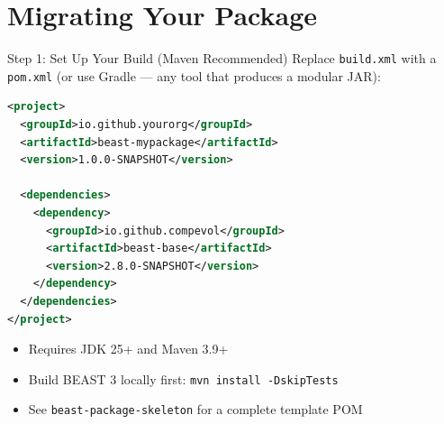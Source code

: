 \documentclass[aspectratio=169,11pt]{beamer}
\newcommand{\code}[1]{\texttt{#1}}
\begin{document}
\section{Migrating Your Package}


\begin{frame}[fragile]{Step 1: Set Up Your Build (Maven Recommended)}
Replace \code{build.xml} with a \code{pom.xml} (or use Gradle --- any tool that produces a modular JAR):

\begin{lstlisting}[language=XML]
<project>
  <groupId>io.github.yourorg</groupId>
  <artifactId>beast-mypackage</artifactId>
  <version>1.0.0-SNAPSHOT</version>

  <dependencies>
    <dependency>
      <groupId>io.github.compevol</groupId>
      <artifactId>beast-base</artifactId>
      <version>2.8.0-SNAPSHOT</version>
    </dependency>
  </dependencies>
</project>
\end{lstlisting}

\begin{itemize}
\item Requires JDK 25+ and Maven 3.9+
\item Build BEAST 3 locally first: \code{mvn install -DskipTests}
\item See \code{beast-package-skeleton} for a complete template POM
\end{itemize}
\end{frame}

\end{document}
